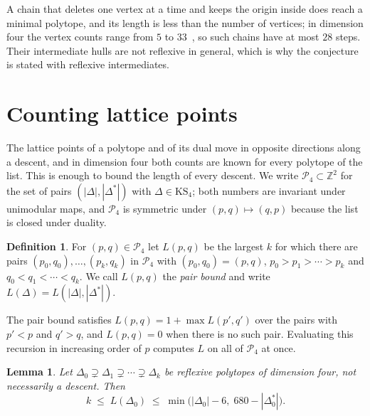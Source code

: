 \documentclass[11pt]{amsart}
\newtheorem{lemma}[theorem]{Lemma}
\theoremstyle{definition}
\newtheorem{definition}[theorem]{Definition}
\theoremstyle{remark}
\newcommand{\Z}{\mathbb{Z}}
\newcommand{\KS}{\mathrm{KS}}
\begin{document}
A chain that deletes one vertex at a time and keeps the origin inside
does reach a minimal polytope, and its length is less than the number of
vertices; in dimension four the vertex counts range from $5$ to
$33$~\cite{KS00}, so such chains have at most $28$ steps. Their
intermediate hulls are not reflexive in general, which is why the
conjecture is stated with reflexive intermediates.

\section{Counting lattice points}\label{sec:counting}

The lattice points of a polytope and of its dual move in opposite
directions along a descent, and in dimension four both counts are known for
every polytope of the list. This is enough to bound the length of every
descent. We write $\mathcal{P}_4\subset\Z^2$ for the set of pairs
$(|\Delta|,|\Delta^*|)$ with $\Delta\in\KS_4$; both numbers are invariant
under unimodular maps, and $\mathcal{P}_4$ is symmetric under
$(p,q)\mapsto(q,p)$ because the list is closed under duality.

\begin{definition}\label{def:pairbound}
For $(p,q)\in\mathcal{P}_4$ let $L(p,q)$ be the largest $k$ for which
there are pairs $(p_0,q_0),\dots,(p_k,q_k)$ in $\mathcal{P}_4$ with
$(p_0,q_0)=(p,q)$, $p_0>p_1>\cdots>p_k$ and $q_0<q_1<\cdots<q_k$. We call
$L(p,q)$ the \emph{pair bound} and write $L(\Delta)=L(|\Delta|,|\Delta^*|)$.
\end{definition}

The pair bound satisfies $L(p,q)=1+\max L(p',q')$ over the pairs with
$p'<p$ and $q'>q$, and $L(p,q)=0$ when there is no such pair. Evaluating
this recursion in increasing order of $p$ computes $L$ on all of
$\mathcal{P}_4$ at once.

\begin{lemma}\label{lem:counting}
Let $\Delta_0\supsetneq\Delta_1\supsetneq\cdots\supsetneq\Delta_k$ be
reflexive polytopes of dimension four, not necessarily a descent. Then
\[
k\;\le\;L(\Delta_0)\;\le\;\min\bigl(|\Delta_0|-6,\;680-|\Delta_0^*|\bigr).
\]
\end{lemma}
\end{document}
